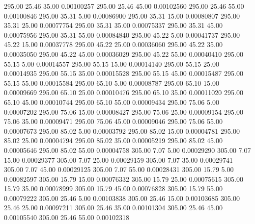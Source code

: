     295.00     25.46     35.00     0.00100257
    295.00     25.46     45.00     0.00102560
    295.00     25.46     55.00     0.00100846
    295.00     35.31      5.00     0.00086900
    295.00     35.31     15.00     0.00080807
    295.00     35.31     25.00     0.00077754
    295.00     35.31     35.00     0.00075337
    295.00     35.31     45.00     0.00075956
    295.00     35.31     55.00     0.00084840
    295.00     45.22      5.00     0.00041737
    295.00     45.22     15.00     0.00037778
    295.00     45.22     25.00     0.00036060
    295.00     45.22     35.00     0.00035050
    295.00     45.22     45.00     0.00036029
    295.00     45.22     55.00     0.00040410
    295.00     55.15      5.00     0.00014557
    295.00     55.15     15.00     0.00014140
    295.00     55.15     25.00     0.00014935
    295.00     55.15     35.00     0.00015528
    295.00     55.15     45.00     0.00015487
    295.00     55.15     55.00     0.00015584
    295.00     65.10      5.00     0.00008787
    295.00     65.10     15.00     0.00009669
    295.00     65.10     25.00     0.00010476
    295.00     65.10     35.00     0.00011020
    295.00     65.10     45.00     0.00010744
    295.00     65.10     55.00     0.00009434
    295.00     75.06      5.00     0.00007202
    295.00     75.06     15.00     0.00008427
    295.00     75.06     25.00     0.00009154
    295.00     75.06     35.00     0.00009471
    295.00     75.06     45.00     0.00009046
    295.00     75.06     55.00     0.00007673
    295.00     85.02      5.00     0.00003792
    295.00     85.02     15.00     0.00004781
    295.00     85.02     25.00     0.00004794
    295.00     85.02     35.00     0.00005219
    295.00     85.02     45.00     0.00005646
    295.00     85.02     55.00     0.00004758
    305.00      7.07      5.00     0.00029290
    305.00      7.07     15.00     0.00029377
    305.00      7.07     25.00     0.00029159
    305.00      7.07     35.00     0.00029741
    305.00      7.07     45.00     0.00029125
    305.00      7.07     55.00     0.00028431
    305.00     15.79      5.00     0.00082597
    305.00     15.79     15.00     0.00076332
    305.00     15.79     25.00     0.00075615
    305.00     15.79     35.00     0.00078999
    305.00     15.79     45.00     0.00076828
    305.00     15.79     55.00     0.00079222
    305.00     25.46      5.00     0.00103838
    305.00     25.46     15.00     0.00103685
    305.00     25.46     25.00     0.00097211
    305.00     25.46     35.00     0.00101304
    305.00     25.46     45.00     0.00105540
    305.00     25.46     55.00     0.00102318

